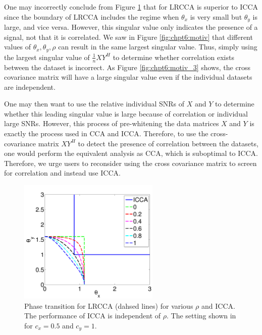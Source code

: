 One may incorrectly conclude from Figure \ref{fig:chpt6:icca_comp} that for LRCCA is
superior to ICCA since the boundary of LRCCA includes the regime when $\theta_x$ is very
small but $\theta_y$ is large, and vice versa. However, this singular value only indicates
the presence of a signal, not that it is correlated. We saw in Figure
\ref{fig:chpt6:motiv} that different values of $\theta_x,\theta_y,\rho$ can result in the
same largest singular value. Thus, simply using the largest singular value of
$\frac{1}{n}XY^H$ to determine whether correlation exists between the dataset is
incorrect. As Figure \ref{fig:chpt6:motiv_3} shows, the cross covariance matrix will have
a large singular value even if the individual datasets are independent. 

One may then want to use the relative individual SNRs of $X$ and $Y$ to determine whether
this leading singular value is large because of correlation or individual large
SNRs. However, this process of pre-whitening the data matrices $X$ and $Y$ is exactly the
process used in CCA and ICCA. Therefore, to use the cross-covariance matrix $XY^H$ to
detect the presence of correlation between the datasets, one would perform the equivalent
analysis as CCA, which is suboptimal to ICCA. Therefore, we urge users to reconsider using
the cross covariance matrix to screen for correlation and instead use ICCA.

\begin{figure}[!h]
  \begin{center}
    \includegraphics[width=0.6\textwidth]{chpt6_xy/figures/theta_theta_icca.pdf}
    \caption{Phase transition for LRCCA (dahsed lines) for various $\rho$ and ICCA. The
      performance of ICCA is independent of $\rho$. The setting shown in for $c_x=0.5$ and
    $c_y=1$. }
    \label{fig:chpt6:icca_comp}
  \end{center}
\end{figure}

